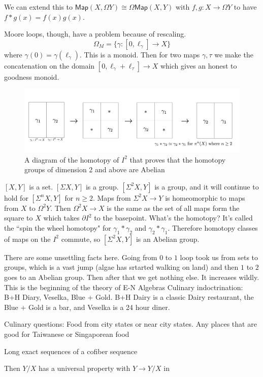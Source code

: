 \documentclass[12pt]{article}
\theoremstyle{definition}
\begin{document}
	
	We can extend this to $\mathsf{Map}(X,\Omega Y)\cong \Omega\mathsf{Map}(X,Y)$ with $f,g:X\to \Omega Y$ to have $f\ast g(x)=f(x)g(x)$. 
	
	Moore loops, though, have a problem because of rescaling.\[
	\Omega_M=\{\gamma:[0,\ell_\gamma]\to X\}
	\]
	where $\gamma(0)=\gamma(\ell_\gamma)$. This is a monoid. Then for two maps $\gamma, \tau$ we make the concatenation on the domain $[0,\ell_\gamma+\ell_\tau]\to X$ which gives an honest to goodness monoid. 
	\begin{figure}
		\includegraphics[width=\textwidth]{homotopygroupsabelian.png}
		\caption{A diagram of the homotopy of $I^2$ that proves that the homotopy groups of dimension 2 and above are Abelian}
	\end{figure}
	
	$[X,Y]$ is a set. $[\Sigma X, Y]$ is a group. $[\Sigma^2 X, Y]$ is a group, and it will continue to hold for $[\Sigma^n X, Y]$ for $n\geq 2$. Maps from $\Sigma^2 X\to Y$ is homeomorphic to maps from $X$ to $\Omega^2 Y$. Then $\Omega^2 X \to X$ is the same as the set of all maps form the square to $X$ which takes $\partial I^2$ to the basepoint. What's the homotopy? It's called the ``spin the wheel homotopy" for $\gamma_1\ast \gamma_2$ and $\gamma_2\ast \gamma_1$. Therefore homotopy classes of maps on the $I^2$ commute, so $[\Sigma^2 X, Y]$ is an Abelian group. 
	
	There are some unsettling facts here. Going from $0$ to $1$ loop took us from sets to groups, which is a vast jump (algae has srtarted walking on land) and then $1$ to $2$ goes to an Abelian group. Then after that we get nothing else. It increases wildly. This is the beginning of the theory of E-N Algebras
		Culinary indoctrination:
	B+H Diary, Veselka, Blue + Gold. B+H Dairy is a classic Dairy restaurant, the Blue + Gold is a bar, and Veselka is a 24 hour diner.
	
	Culinary questions: Food from city states or near city states. Any places that are good for Taiwanese or Singaporean food
	
	Long exact sequences of a cofiber sequence \begin{center}
	\end{center}
	Then $Y/X$ has a universal property with $Y\to Y/X$ in \begin{center}
	\end{center}
	
\end{document}
